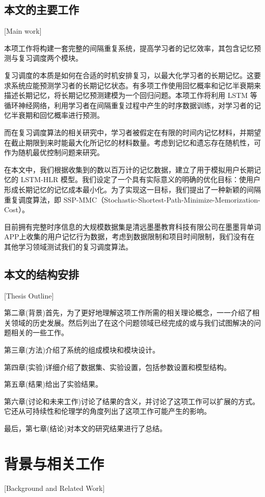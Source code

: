 \section{本文的主要工作}[Main work]

本项工作将构建一套完整的间隔重复系统，提高学习者的记忆效率，其包含记忆预测与复习调度两个模块。

复习调度的本质是如何在合适的时机安排复习，以最大化学习者的长期记忆。这要求系统应能预测学习者的长期记忆状态。有多项工作使用回忆概率和记忆半衰期来描述长期记忆，将长期记忆预测建模为一个回归问题。本项工作将利用 LSTM 等循环神经网络，利用学习者在间隔重复过程中产生的时序数据训练，对学习者的记忆半衰期和回忆概率进行预测。

而在复习调度算法的相关研究中，学习者被假定在有限的时间内记忆材料，并期望在截止期限到来时能最大化所记忆的材料数量。考虑到记忆和遗忘存在随机性，可作为随机最优控制问题来研究。

在本文中，我们根据收集到的数以百万计的记忆数据，建立了用于模拟用户长期记忆的 LSTM-HLR 模型。我们设定了一个具有实际意义的明确的优化目标：使用户形成长期记忆的记忆成本最小化。为了实现这一目标，我们提出了一种新颖的间隔重复调度算法，即 SSP-MMC（Stochastic-Shortest-Path-Minimize-Memorization-Cost）。

目前拥有完整时序信息的大规模数据集是清远墨墨教育科技有限公司在墨墨背单词APP上收集的用户记忆行为数据，考虑到数据限制和项目时间限制，我们没有在其他学习领域测试我们的复习调度算法。

\section{本文的结构安排}[Thesis Outline]

第二章(背景)首先，为了更好地理解这项工作所需的相关理论概念，一一介绍了相关领域的历史发展。然后列出了在这个问题领域已经完成的或与我们试图解决的问题相关的一些工作。

第三章(方法)介绍了系统的组成模块和模块设计。

第四章(实验)详细介绍了数据集、实验设置，包括参数设置和模型结构。

第五章(结果)给出了实验结果。

第六章(讨论和未来工作)讨论了结果的含义，并讨论了这项工作可以扩展的方式。它还从可持续性和伦理学的角度列出了这项工作可能产生的影响。

最后，第七章(结论)对本文的研究结果进行了总结。

\chapter{背景与相关工作}[Background and Related Work]


